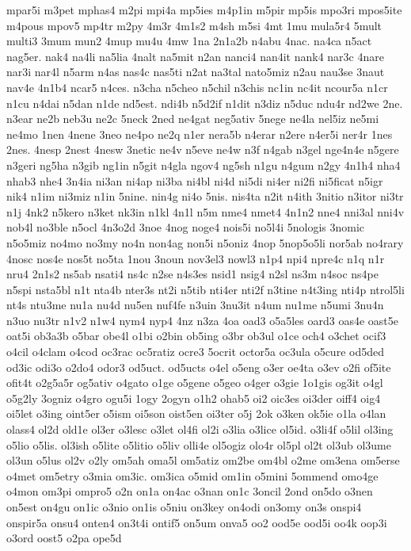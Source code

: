 {mpar5i
m3pet
mphas4
m2pi
mpi4a
mp5ies
m4p1in
m5pir
mp5is
mpo3ri
mpos5ite
m4pous
mpov5
mp4tr
m2py
4m3r
4m1s2
m4sh
m5si
4mt
1mu
mula5r4
5mult
multi3
3mum
mun2
4mup
mu4u
4mw
1na
2n1a2b
n4abu
4nac.
na4ca
n5act
nag5er.
nak4
na4li
na5lia
4nalt
na5mit
n2an
nanci4
nan4it
nank4
nar3c
4nare
nar3i
nar4l
n5arm
n4as
nas4c
nas5ti
n2at
na3tal
nato5miz
n2au
nau3se
3naut
nav4e
4n1b4
ncar5
n4ces.
n3cha
n5cheo
n5chil
n3chis
nc1in
nc4it
ncour5a
n1cr
n1cu
n4dai
n5dan
n1de
nd5est.
ndi4b
n5d2if
n1dit
n3diz
n5duc
ndu4r
nd2we
2ne.
n3ear
ne2b
neb3u
ne2c
5neck
2ned
ne4gat
neg5ativ
5nege
ne4la
nel5iz
ne5mi
ne4mo
1nen
4nene
3neo
ne4po
ne2q
n1er
nera5b
n4erar
n2ere
n4er5i
ner4r
1nes
2nes.
4nesp
2nest
4nesw
3netic
ne4v
n5eve
ne4w
n3f
n4gab
n3gel
nge4n4e
n5gere
n3geri
ng5ha
n3gib
ng1in
n5git
n4gla
ngov4
ng5sh
n1gu
n4gum
n2gy
4n1h4
nha4
nhab3
nhe4
3n4ia
ni3an
ni4ap
ni3ba
ni4bl
ni4d
ni5di
ni4er
ni2fi
ni5ficat
n5igr
nik4
n1im
ni3miz
n1in
5nine.
nin4g
ni4o
5nis.
nis4ta
n2it
n4ith
3nitio
n3itor
ni3tr
n1j
4nk2
n5kero
n3ket
nk3in
n1kl
4n1l
n5m
nme4
nmet4
4n1n2
nne4
nni3al
nni4v
nob4l
no3ble
n5ocl
4n3o2d
3noe
4nog
noge4
nois5i
no5l4i
5nologis
3nomic
n5o5miz
no4mo
no3my
no4n
non4ag
non5i
n5oniz
4nop
5nop5o5li
nor5ab
no4rary
4nosc
nos4e
nos5t
no5ta
1nou
3noun
nov3el3
nowl3
n1p4
npi4
npre4c
n1q
n1r
nru4
2n1s2
ns5ab
nsati4
ns4c
n2se
n4s3es
nsid1
nsig4
n2sl
ns3m
n4soc
ns4pe
n5spi
nsta5bl
n1t
nta4b
nter3s
nt2i
n5tib
nti4er
nti2f
n3tine
n4t3ing
nti4p
ntrol5li
nt4s
ntu3me
nu1a
nu4d
nu5en
nuf4fe
n3uin
3nu3it
n4um
nu1me
n5umi
3nu4n
n3uo
nu3tr
n1v2
n1w4
nym4
nyp4
4nz
n3za
4oa
oad3
o5a5les
oard3
oas4e
oast5e
oat5i
ob3a3b
o5bar
obe4l
o1bi
o2bin
ob5ing
o3br
ob3ul
o1ce
och4
o3chet
ocif3
o4cil
o4clam
o4cod
oc3rac
oc5ratiz
ocre3
5ocrit
octor5a
oc3ula
o5cure
od5ded
od3ic
odi3o
o2do4
odor3
od5uct.
od5ucts
o4el
o5eng
o3er
oe4ta
o3ev
o2fi
of5ite
ofit4t
o2g5a5r
og5ativ
o4gato
o1ge
o5gene
o5geo
o4ger
o3gie
1o1gis
og3it
o4gl
o5g2ly
3ogniz
o4gro
ogu5i
1ogy
2ogyn
o1h2
ohab5
oi2
oic3es
oi3der
oiff4
oig4
oi5let
o3ing
oint5er
o5ism
oi5son
oist5en
oi3ter
o5j
2ok
o3ken
ok5ie
o1la
o4lan
olass4
ol2d
old1e
ol3er
o3lesc
o3let
ol4fi
ol2i
o3lia
o3lice
ol5id.
o3li4f
o5lil
ol3ing
o5lio
o5lis.
ol3ish
o5lite
o5litio
o5liv
olli4e
ol5ogiz
olo4r
ol5pl
ol2t
ol3ub
ol3ume
ol3un
o5lus
ol2v
o2ly
om5ah
oma5l
om5atiz
om2be
om4bl
o2me
om3ena
om5erse
o4met
om5etry
o3mia
om3ic.
om3ica
o5mid
om1in
o5mini
5ommend
omo4ge
o4mon
om3pi
ompro5
o2n
on1a
on4ac
o3nan
on1c
3oncil
2ond
on5do
o3nen
on5est
on4gu
on1ic
o3nio
on1is
o5niu
on3key
on4odi
on3omy
on3s
onspi4
onspir5a
onsu4
onten4
on3t4i
ontif5
on5um
onva5
oo2
ood5e
ood5i
oo4k
oop3i
o3ord
oost5
o2pa
ope5d
}
